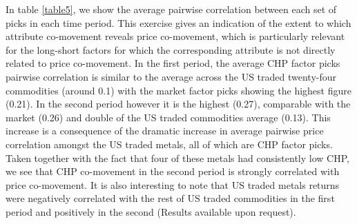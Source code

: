 \documentclass[]{elsarticle} %
\begin{document}
In table \ref{table5}, we show the average pairwise correlation between
each set of picks in each time period. This exercise gives an indication
of the extent to which attribute co-movement reveals price co-movement,
which is particularly relevant for the long-short factors for which the
corresponding attribute is not directly related to price co-movement. In
the first period, the average CHP factor picks pairwise correlation is
similar to the average across the US traded twenty-four commodities
(around 0.1) with the market factor picks showing the highest figure
(0.21). In the second period however it is the highest (0.27),
comparable with the market (0.26) and double of the US traded
commodities average (0.13). This increase is a consequence of the
dramatic increase in average pairwise price correlation amongst the US
traded metals, all of which are CHP factor picks. Taken together with
the fact that four of these metals had consistently low CHP, we see that
CHP co-movement in the second period is strongly correlated with price
co-movement. It is also interesting to note that US traded metals
returns were negatively correlated with the rest of US traded
commodities in the first period and positively in the second (Results
available upon request).
\end{document}
